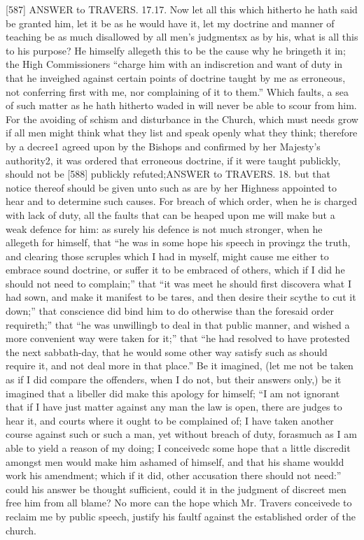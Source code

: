 [587]
ANSWER to TRAVERS. 17.17. Now let all this which hitherto he hath said be granted him, let it be as he would have it, let my doctrine and manner of teaching be as much disallowed by all men’s judgmentsx as by his, what is all this to his purpose? He himselfy allegeth this to be the cause why he bringeth it in; the High Commissioners “charge him with an indiscretion and want of duty in that he inveighed against certain points of doctrine taught by me as erroneous, not conferring first with me, nor complaining of it to them.” Which faults, a sea of such matter as he hath hitherto waded in will never be able to scour from him. For the avoiding of schism and disturbance in the Church, which must needs grow if all men might think what they list and speak openly what they think; therefore by a decree1 agreed upon by the Bishops and confirmed by her Majesty’s authority2, it was ordered that erroneous doctrine, if it were taught publickly, should not be [588] publickly refuted;ANSWER to TRAVERS. 18. but that notice thereof should be given unto such as are by her Highness appointed to hear and to determine such causes. For breach of which order, when he is charged with lack of duty, all the faults that can be heaped upon me will make but a weak defence for him: as surely his defence is not much stronger, when he allegeth for himself, that “he was in some hope his speech in provingz the truth, and clearing those scruples which I had in myself, might cause me either to embrace sound doctrine, or suffer it to be embraced of others, which if I did he should not need to complain;” that “it was meet he should first discovera what I had sown, and make it manifest to be tares, and then desire their scythe to cut it down;” that conscience did bind him to do otherwise than the foresaid order requireth;” that “he was unwillingb to deal in that public manner, and wished a more convenient way were taken for it;” that “he had resolved to have protested the next sabbath-day, that he would some other way satisfy such as should require it, and not deal more in that place.” Be it imagined, (let me not be taken as if I did compare the offenders, when I do not, but their answers only,) be it imagined that a libeller did make this apology for himself; “I am not ignorant that if I have just matter against any man the law is open, there are judges to hear it, and courts where it ought to be complained of; I have taken another course against such or such a man, yet without breach of duty, forasmuch as I am able to yield a reason of my doing; I conceivedc some hope that a little discredit amongst men would make him ashamed of himself, and that his shame wouldd work his amendment; which if it did, other accusation there should not need:” could his answer be thought sufficient, could it in the judgment of discreet men free him from all blame? No more can the hope which Mr. Travers conceivede to reclaim me by public speech, justify his faultf against the established order of the church.

